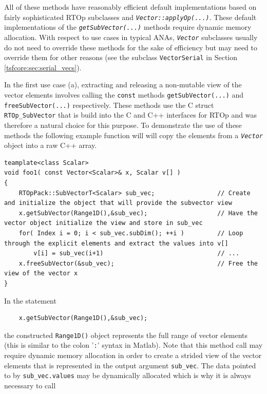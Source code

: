 \documentclass[10pt,fleqn]{article}
\begin{document}
All of these methods have reasonably efficient default implementations
based on fairly sophisticated RTOp subclasses and
\texttt{\textit{Vector::applyOp(...)}}.  These default implementations of the
\texttt{\textit{getSubVector(...)}} methods require dynamic memory allocation.
With respect to use cases in typical ANAs, \texttt{\textit{Vector}}
subclasses usually do not need to override these methods for the sake
of efficiency but may need to override them for other reasons (see the
subclass \texttt{VectorSerial} in Section \ref{tsfcore:sec:serial_vecs}).

In the first use case (a), extracting and releasing a non-mutable view of the
vector elements involves calling the \texttt{const} methods
\texttt{getSubVector(...)} and
\texttt{freeSubVector(...)} respectively.  These methods use the C struct
\texttt{RTOp\_SubVector} that is build into the C and C++ interfaces for RTOp
and was therefore a natural choice for this purpose.  To demonstrate
the use of these methods the following example function will will copy
the elements from a \texttt{\textit{Vector}} object into a raw C++
array.

{\scriptsize\begin{verbatim}
teamplate<class Scalar>
void foo1( const Vector<Scalar>& x, Scalar v[] )
{
    RTOpPack::SubVectorT<Scalar> sub_vec;                 // Create and initialize the object that will provide the subvector view
    x.getSubVector(Range1D(),&sub_vec);                   // Have the vector object initialize the view and store in sub_vec
    for( Index i = 0; i < sub_vec.subDim(); ++i )         // Loop through the explicit elements and extract the values into v[]
        v[i] = sub_vec(i+1)                               // ...
    x.freeSubVector(&sub_vec);                            // Free the view of the vector x
}
\end{verbatim}}

In the statement

{\scriptsize\begin{verbatim}
    x.getSubVector(Range1D(),&sub_vec);
\end{verbatim}}

the constructed \texttt{Range1D()} object represents the full range of
vector elements (this is similar to the colon '\texttt{:}' syntax
in Matlab).  Note that this method call may require dynamic memory
allocation in order to create a strided view of the vector elements
that is represented in the output argument \texttt{sub\_vec}.  The
data pointed to by \texttt{sub\_vec.values} may be dynamically
allocated which is why it is always necessary to call
\end{document}
